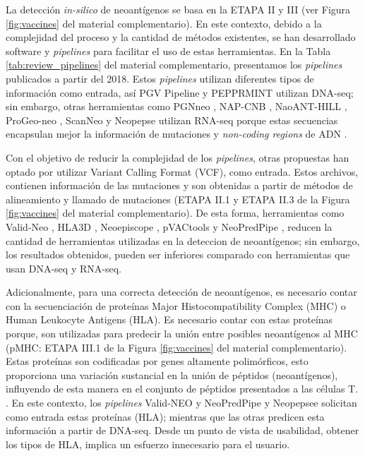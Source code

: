 \documentclass[a4paper,11pt]{article}
\begin{document}
	
La detección \textit{in-silico} de neoantígenos se basa en la ETAPA II y III (ver Figura \ref{fig:vaccines} del material complementario). En este contexto, debido a la complejidad del proceso y la cantidad de métodos existentes, se han desarrollado software y \textit{pipelines} para facilitar el uso de estas herramientas. En la Tabla \ref{tab:review_pipelines} del material complementario, presentamos los \textit{pipelines} publicados a partir del 2018. Estos \textit{pipelines} utilizan diferentes tipos de información como entrada, así PGV Pipeline \cite{rubinsteyn2018computational} y PEPPRMINT \cite{zhou2023prioritizing} utilizan DNA-seq; sin embargo, otras herramientas como PGNneo \cite{tan2023pgnneo}, NAP-CNB \cite{wert2021predicting}, NaoANT-HILL \cite{coelho2020neoant}, ProGeo-neo \cite{li2020progeo}, ScanNeo \cite{wang2019scanneo} y Neopepse \cite{kim2018neopepsee} utilizan RNA-seq porque estas secuencias encapsulan mejor la información de mutaciones y \textit{non-coding regions} de ADN \cite{tan2023pgnneo}. 

Con el objetivo de reducir la complejidad de los \textit{pipelines}, otras propuestas han optado por utilizar Variant Calling Format (VCF), como entrada. Estos archivos, contienen información de las mutaciones y son obtenidas a partir de métodos de alineamiento y llamado de mutaciones (ETAPA II.1 y ETAPA II.3 de la Figura \ref{fig:vaccines} del material complementario). De esta forma, herramientas como Valid-Neo \cite{terai2022valid}, HLA3D \cite{li2022hla3d}, Neoepiscope \cite{wood2020neoepiscope} , pVACtools \cite{hundal2020pvactools} y NeoPredPipe \cite{schenck2019neopredpipe}, reducen la cantidad de herramientas utilizadas en la deteccion de neoantígenos; sin embargo, los resultados obtenidos, pueden ser inferiores comparado con herramientas que usan DNA-seq y RNA-seq. 

Adicionalmente, para una correcta detección de neoantígenos, es necesario contar con la secuenciación de proteínas Major Histocompatibility Complex (MHC) o Human Leukocyte Antigens (HLA). Es necesario contar con estas proteínas porque, son utilizadas para predecir la unión entre posibles neoantígenos al MHC (pMHC: ETAPA III.1 de la Figura \ref{fig:vaccines} del material complementario). Estas proteínas son codificadas por genes altamente polimórficos, esto proporciona una variación sustancial en la unión de péptidos (neoantígenos), influyendo de esta manera en el conjunto de péptidos presentados a las células T. \cite{abualrous2021major}. En este contexto,  los \textit{pipelines} Valid-NEO \cite{terai2022valid}  y NeoPredPipe \cite{schenck2019neopredpipe} y Neopepsee \cite{kim2018neopepsee} solicitan como entrada estas proteínas (HLA); mientras que las otras predicen esta información a partir de DNA-seq. Desde un punto de vista de usabilidad, obtener los tipos de HLA, implica un esfuerzo innecesario para el usuario.
\end{document}

